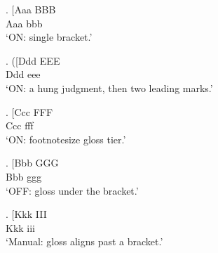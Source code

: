 


\GlossPhantomAlign
\ex. \gll [Aaa BBB \\
     Aaa bbb \\
\glt `ON: single bracket.'

\ex. \gll *([Ddd EEE \\
     Ddd eee \\
\glt `ON: a hung judgment, then two leading marks.'

{%
\ex. \gll [Ccc FFF \\
     Ccc fff \\
\glt `ON: footnotesize gloss tier.'
}

\GlossPhantomAlignOff
\ex. \gll [Bbb GGG \\
     Bbb ggg \\
\glt `OFF: gloss under the bracket.'

\ex. \gll [Kkk III \\
     \GlossPhantom{[}Kkk iii \\
\glt `Manual: gloss aligns past a bracket.'

